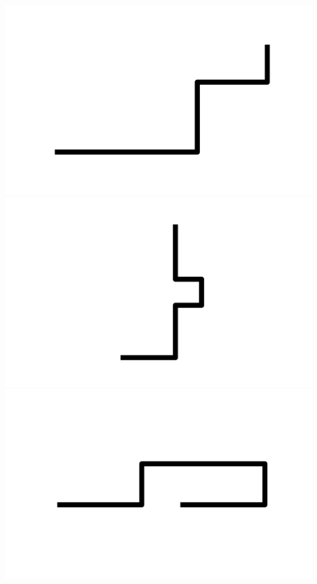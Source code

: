 \documentclass[]{report}
\begin{document}
\includegraphics[scale=.1]{pictures/21/state_cluster_shapes_415.pdf} 
\includegraphics[scale=.1]{pictures/21/state_cluster_shapes_416.pdf} 
\includegraphics[scale=.1]{pictures/21/state_cluster_shapes_417.pdf} 
\end{document}
